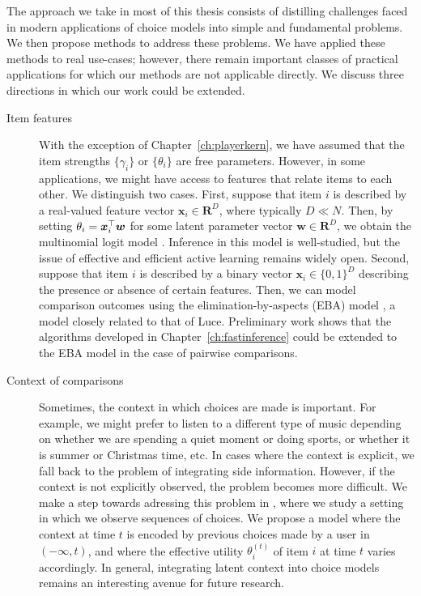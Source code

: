 The approach we take in most of this thesis consists of distilling challenges faced in modern applications of choice models into simple and fundamental problems.
We then propose methods to address these problems.
We have applied these methods to real use-cases; however, there remain important classes of practical applications for which our methods are not applicable directly.
We discuss three directions in which our work could be extended.

\begin{description}
\item[Item features] With the exception of Chapter~\ref{ch:playerkern}, we have assumed that the item strengths $\{ \gamma_i \}$ or $\{ \theta_i \}$ are free parameters.
However, in some applications, we might have access to features that relate items to each other.
We distinguish two cases.
First, suppose that item $i$ is described by a real-valued feature vector $\bm{x}_i \in \mathbf{R}^D$, where typically $D \ll N$.
Then, by setting $\theta_i = \bm{x}_i^\top \bm{w}$ for some latent parameter vector $\bm{w} \in \mathbf{R}^D$, we obtain the multinomial logit model \citep{mcfadden1973conditional, train2009discrete}.
Inference in this model is well-studied, but the issue of effective and efficient active learning remains widely open.
Second, suppose that item $i$ is described by a binary vector $\bm{x}_i \in \{0, 1\}^D$ describing the presence or absence of certain features.
Then, we can model comparison outcomes using the elimination-by-aspects (EBA) model \citep{tversky1972elimination}, a model closely related to that of Luce.
Preliminary work shows that the algorithms developed in Chapter~\ref{ch:fastinference} could be extended to the EBA model in the case of pairwise comparisons.

\item[Context of comparisons] Sometimes, the context in which choices are made is important.
For example, we might prefer to listen to a different type of music depending on whether we are spending a quiet moment or doing sports, or whether it is summer or Christmas time, etc.
In cases where the context is explicit, we fall back to the problem of integrating side information.
However, if the context is not explicitly observed, the problem becomes more difficult.
We make a step towards adressing this problem in \citet{ko2016collaborative}, where we study a setting in which we observe sequences of choices.
We propose a model where the context at time $t$ is encoded by previous choices made by a user in $(-\infty, t)$, and where the effective utility $\theta_i^{(t)}$ of item $i$ at time $t$ varies accordingly.
In general, integrating latent context into choice models remains an interesting avenue for future research.


\end{description}
